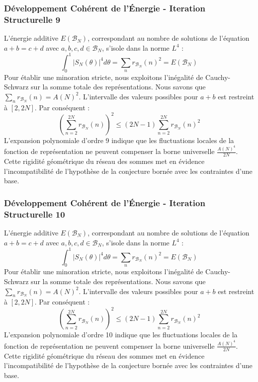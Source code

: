 \documentclass[11pt,a4paper]{article}
\begin{document}
\subsubsection{Développement Cohérent de l'Énergie - Iteration Structurelle 9}
L'énergie additive $E(\mathcal{B}_N)$, correspondant au nombre de solutions de l'équation $a+b = c+d$ avec $a,b,c,d \in \mathcal{B}_N$, s'isole dans la norme $L^4$ :
$$ \int_{0}^{1} |S_N(\theta)|^4 d\theta = \sum_{n} r_{\mathcal{B}_N}(n)^2 = E(\mathcal{B}_N) $$
Pour établir une minoration stricte, nous exploitons l'inégalité de Cauchy-Schwarz sur la somme totale des représentations. Nous savons que $\sum_{n} r_{\mathcal{B}_N}(n) = A(N)^2$. L'intervalle des valeurs possibles pour $a+b$ est restreint à $[2, 2N]$.
Par conséquent :
$$ \left( \sum_{n=2}^{2N} r_{\mathcal{B}_N}(n) \right)^2 \leq (2N - 1) \sum_{n=2}^{2N} r_{\mathcal{B}_N}(n)^2 $$
L'expansion polynomiale d'ordre 9 indique que les fluctuations locales de la fonction de représentation ne peuvent compenser la borne universelle $\frac{A(N)^4}{2N}$. Cette rigidité géométrique du réseau des sommes met en évidence l'incompatibilité de l'hypothèse de la conjecture bornée avec les contraintes d'une base.
\subsubsection{Développement Cohérent de l'Énergie - Iteration Structurelle 10}
L'énergie additive $E(\mathcal{B}_N)$, correspondant au nombre de solutions de l'équation $a+b = c+d$ avec $a,b,c,d \in \mathcal{B}_N$, s'isole dans la norme $L^4$ :
$$ \int_{0}^{1} |S_N(\theta)|^4 d\theta = \sum_{n} r_{\mathcal{B}_N}(n)^2 = E(\mathcal{B}_N) $$
Pour établir une minoration stricte, nous exploitons l'inégalité de Cauchy-Schwarz sur la somme totale des représentations. Nous savons que $\sum_{n} r_{\mathcal{B}_N}(n) = A(N)^2$. L'intervalle des valeurs possibles pour $a+b$ est restreint à $[2, 2N]$.
Par conséquent :
$$ \left( \sum_{n=2}^{2N} r_{\mathcal{B}_N}(n) \right)^2 \leq (2N - 1) \sum_{n=2}^{2N} r_{\mathcal{B}_N}(n)^2 $$
L'expansion polynomiale d'ordre 10 indique que les fluctuations locales de la fonction de représentation ne peuvent compenser la borne universelle $\frac{A(N)^4}{2N}$. Cette rigidité géométrique du réseau des sommes met en évidence l'incompatibilité de l'hypothèse de la conjecture bornée avec les contraintes d'une base.
\end{document}
